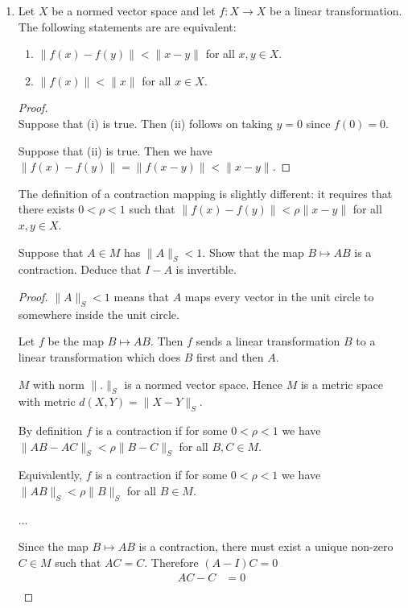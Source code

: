 \documentclass[12pt]{article}
\begin{document}
\begin{enumerate}
\begin{proof}
\begin{enumerate}
    \end{enumerate}
  \end{proof}
\item
  \begin{lemma*}
    Let $X$ be a normed vector space and let $f:X \to X$ be a linear transformation. The following
    statements are are equivalent:
    \begin{enumerate}[label=(\roman*)]
    \item $\|f(x) - f(y)\| < \|x - y\|$ for all $x, y \in X$.
    \item $\|f(x)\| < \|x\|$ for all $x \in X$.
    \end{enumerate}
  \end{lemma*}
  \begin{proof}~\\
    Suppose that (i) is true. Then (ii) follows on taking $y = 0$ since $f(0) = 0$.

    Suppose that (ii) is true. Then we have $\|f(x) - f(y)\| = \|f(x - y)\| < \|x - y\|$.
  \end{proof}
  \begin{remark*}
    The definition of a contraction mapping is slightly different: it requires that there exists
    $0 < \rho < 1$ such that $\|f(x) - f(y)\| < \rho\|x - y\|$ for all $x, y \in X$.
  \end{remark*}


  \begin{claim*}
    Suppose that $A \in M$ has $\|A\|_S < 1$. Show that the map $B \mapsto AB$ is a
    contraction. Deduce that $I - A$ is invertible.
  \end{claim*}
  \begin{proof}
    $\|A\|_S < 1$ means that $A$ maps every vector in the unit circle to somewhere inside the unit
    circle.

    Let $f$ be the map $B \mapsto AB$. Then $f$ sends a linear transformation $B$ to a linear
    transformation which does $B$ first and then $A$.

    $M$ with norm $\|.\|_S$ is a normed vector space. Hence $M$ is a metric space with metric
    $d(X, Y) = \|X - Y\|_S$.

    By definition $f$ is a contraction if for some $0 < \rho < 1$ we have
    $\|AB - AC\|_S < \rho\|B - C\|_S$ for all $B, C \in M$.

    Equivalently, $f$ is a contraction if for some $0 < \rho < 1$ we have $\|AB\|_S < \rho\|B\|_S$
    for all $B \in M$.

    ...

    Since the map $B \mapsto AB$ is a contraction, there must exist a unique non-zero $C \in M$
    such that $AC = C$. Therefore $(A - I)C = 0$
    \begin{align*}
      AC - C   &= 0\\
    \end{align*}

  \end{proof}
\end{enumerate}
\end{document}
